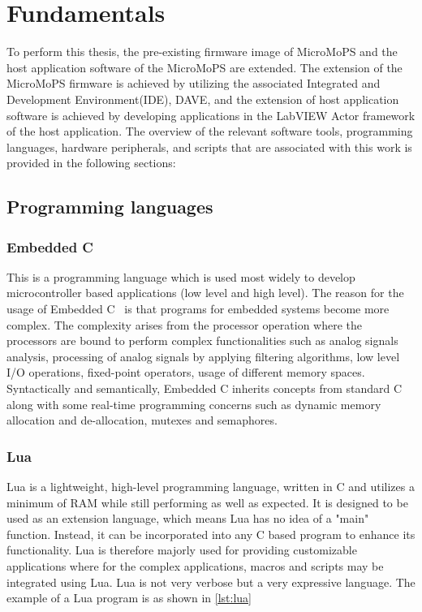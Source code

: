 \chapter{Fundamentals}
To perform this thesis, the pre-existing firmware image of MicroMoPS and the host application software of the MicroMoPS are extended.
The extension of the MicroMoPS firmware is achieved by utilizing the associated Integrated and Development Environment(IDE), \Gls{DAVE}, and the extension of host application software is achieved by developing applications in the \Gls{LabVIEW} Actor framework of the host application.
The overview of the relevant software tools, programming languages, hardware peripherals, and scripts that are associated with this work is provided in the following sections:    

\section{Programming languages}

\subsection{Embedded C}\label{sec:EmbeddedC}

This is a programming language which is used most widely to develop microcontroller based applications (low level and high level).
The reason for the usage of Embedded C~\cite{Kernighan1988a} is that programs for embedded systems become more complex. 
The complexity arises from the processor operation where the processors are bound to perform complex functionalities such as analog signals analysis, processing of analog signals by applying filtering algorithms, low level I/O operations, fixed-point operators, usage of different memory spaces.
Syntactically and semantically, Embedded C inherits concepts from standard C along with some real-time programming concerns such as dynamic memory allocation and de-allocation, mutexes and semaphores.

\subsection{Lua}\label{sec:Lua}

Lua is a lightweight, high-level programming language, written in C and utilizes a minimum of RAM while still performing as well as expected.
It is designed to be used as an extension language, which means Lua has no idea of a "main" function.
Instead, it can be incorporated into any C based program to enhance its functionality.
Lua is therefore majorly used for providing customizable applications where for the complex applications, macros and scripts may be integrated using Lua.
Lua is not very verbose but a very expressive language.
The example of a Lua program is as shown in \cref{lst:lua}	

